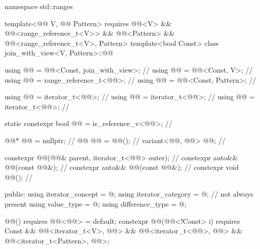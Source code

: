 \begin{codeblock}
namespace std::ranges {
  template<@@ V, @@ Pattern>
    requires @@<V> && @@<range_reference_t<V>>
          && @@<Pattern> && @@<range_reference_t<V>, Pattern>
  template<bool Const>
  class join_with_view<V, Pattern>::@@ {
    using @@ = @@<Const, join_with_view>;                  // \expos
    using @@ = @@<Const, V>;                                 // \expos
    using @@ = range_reference_t<@@>;                          // \expos
    using @@ = @@<Const, Pattern>;                    // \expos

    using @@ = iterator_t<@@>;                                 // \expos
    using @@ = iterator_t<@@>;                            // \expos
    using @@ = iterator_t<@@>;                        // \expos

    static constexpr bool @@ = is_reference_v<@@>;   // \expos

    @@* @@ = nullptr;                                          // \expos
    @@ @@ = @@();                                  // \expos
    variant<@@, @@> @@;                          // \expos

    constexpr @@(@@& parent, iterator_t<@@> outer);         // \expos
    constexpr auto&& @@(const @@&);                    // \expos
    constexpr auto&& @@(const @@&);                       // \expos
    constexpr void @@();                                           // \expos

  public:
    using iterator_concept = @\seebelow@;
    using iterator_category = @\seebelow@;                                // not always present
    using value_type = @\seebelow@;
    using difference_type = @\seebelow@;

    @@() requires @@<@@> = default;
    constexpr @@(@@<!Const> i)
      requires Const && @@<iterator_t<V>, @@> &&
               @@<iterator_t<@@>, @@> &&
               @@<iterator_t<Pattern>, @@>;

}}
\end{codeblock}
